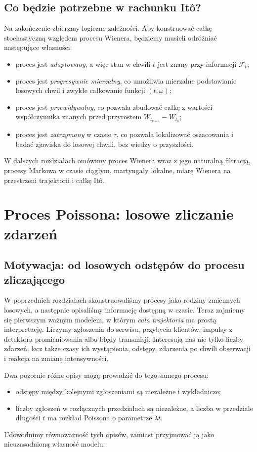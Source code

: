 \documentclass[11pt,a4paper,oneside]{report}
\numberwithin{equation}{chapter}
\theoremstyle{plain}
\theoremstyle{definition}
\theoremstyle{remark}
\newcommand{\calF}{\mathcal{F}}
\begin{document}
\section{Co będzie potrzebne w rachunku Itô?}
Na zakończenie zbierzmy logiczne zależności.
Aby konstruować całkę stochastyczną względem procesu Wienera,
będziemy musieli odróżniać następujące własności:
\begin{itemize}
\item proces jest \emph{adaptowany}, a więc stan w chwili $t$
jest znany przy informacji $\calF_t$;
\item proces jest \emph{progresywnie mierzalny}, co umożliwia
mierzalne podstawianie losowych chwil i zwykłe całkowanie
funkcji $(t,\omega)$;
\item proces jest \emph{przewidywalny}, co pozwala zbudować
całkę z wartości współczynnika znanych przed
przyrostem $W_{t_{k+1}}-W_{t_k}$;
\item proces jest \emph{zatrzymany} w czasie $\tau$,
co pozwala lokalizować oszacowania i badać zjawiska
do losowej chwili, bez wiedzy o przyszłości.
\end{itemize}
W dalszych rozdziałach omówimy proces Wienera
wraz z jego naturalną filtracją, procesy Markowa
w czasie ciągłym, martyngały lokalne, miarę Wienera
na przestrzeni trajektorii i całkę Itô.


\chapter{Proces Poissona: losowe zliczanie zdarzeń}
\label{ch:poisson-process}

\section{Motywacja: od losowych odstępów do procesu zliczającego}
W poprzednich rozdziałach skonstruowaliśmy procesy jako rodziny
zmiennych losowych, a następnie opisaliśmy informację dostępną w czasie.
Teraz zajmiemy się pierwszym ważnym modelem, w którym \emph{cała
trajektoria} ma prostą interpretację. Liczymy zgłoszenia do serwisu,
przybycia klientów, impulsy z detektora promieniowania albo błędy
transmisji. Interesują nas nie tylko liczby zdarzeń, lecz także czasy
ich wystąpienia, odstępy, zdarzenia po chwili obserwacji i reakcja na
zmianę intensywności.

Dwa pozornie różne opisy mogą prowadzić do tego samego procesu:
\begin{itemize}
\item odstępy między kolejnymi zgłoszeniami są niezależne i wykładnicze;
\item liczby zgłoszeń w rozłącznych przedziałach są niezależne, a liczba
w przedziale długości $t$ ma rozkład Poissona o parametrze $\lambda t$.
\end{itemize}
Udowodnimy równoważność tych opisów, zamiast przyjmować ją jako
nieuzasadnioną własność modelu.
\end{document}
